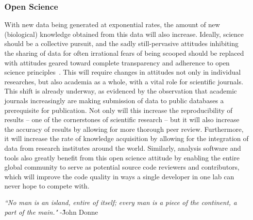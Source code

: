 \subsubsection{Open Science}
With new data being generated at exponential rates, the amount of new (biological) knowledge obtained from this data will also increase.
Ideally, science should be a collective pursuit, and the sadly still-pervasive attitudes inhibiting the sharing of data for often irrational fears of being scooped should be replaced with attitudes geared toward complete transparency and adherence to open science principles~\cite{nosek2015promoting}.
This will require changes in attitudes not only in individual researches, but also academia as a whole, with a vital role for scientific journals.
This shift is already underway, as evidenced by the observation that academic journals increasingly are making submission of data to public databases a prerequisite for publication.
Not only will this increase the reproducibility of results -- one of the cornerstones of scientific research -- but it will also increase the accuracy of results by allowing for more thorough peer review.
Furthermore, it will increase the rate of knowledge acquisition by allowing for the integration of data from research institutes around the world.
Similarly, analysis software and tools also greatly benefit from this open science attitude by enabling the entire global community to serve as potential source code reviewers and contributors, which will improve the code quality in ways a single developer in one lab can never hope to compete with.


\begin{center}
\emph{“No man is an island, entire of itself; every man is a piece of the continent, a part of the main."} -\~John Donne
\end{center}



